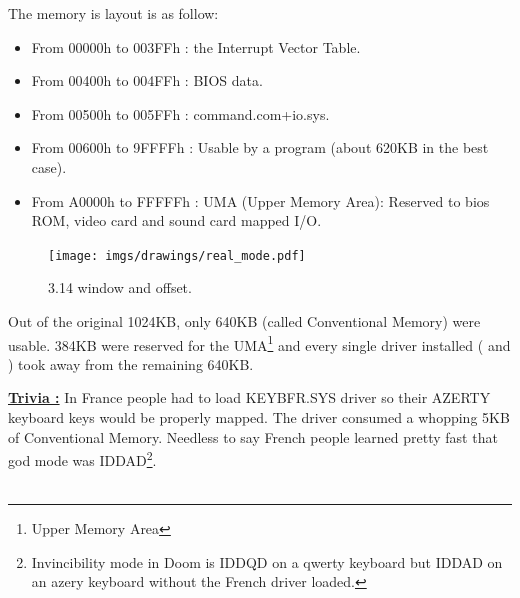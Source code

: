 \documentclass[book.tex]{subfiles}
\begin{document}
  \bigskip
The memory is layout is as follow:\\
\begin{itemize}
\item From 00000h to 003FFh : the Interrupt Vector Table.
\item From 00400h to 004FFh : BIOS data.
\item From 00500h to 005FFh : command.com+io.sys.
\item From 00600h to 9FFFFh : Usable by a program (about 620KB in the best case). 
\item From A0000h to FFFFFh : UMA (Upper Memory Area): Reserved to bios ROM, video card and sound card mapped I/O.
\end{itemize}

\begin{figure}[H]
\centering
\texttt{[image: imgs/drawings/real\_mode.pdf]}

\caption{3.14 window and offset.}
\label{fig:fp_internals}
\end{figure}


Out of the original 1024KB, only 640KB (called Conventional Memory) were usable. 384KB were reserved for the UMA\footnote{Upper Memory Area} and every single driver installed ( and )  took away from the remaining 640KB.

\bigskip

\textbf{\underline{Trivia :}}  In France people had to load KEYBFR.SYS driver so their AZERTY keyboard keys would be properly mapped. The driver consumed a whopping 5KB of Conventional Memory. Needless to say French people learned pretty fast that god mode was IDDAD\footnote{Invincibility mode in Doom is IDDQD on a qwerty keyboard but IDDAD on an azery keyboard without the French driver loaded.}.\\
\\
\end{document}
